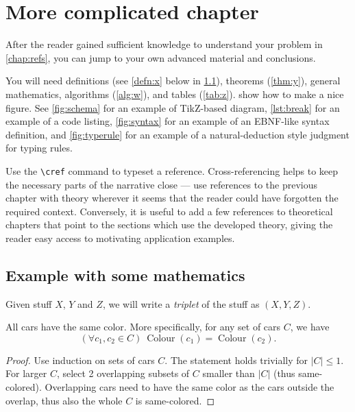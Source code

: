 \chapter{More complicated chapter}\label{chap:math}

After the reader gained sufficient knowledge to understand your problem in \cref{chap:refs}, you can jump to your own advanced material and conclusions.

You will need definitions (see \cref{defn:x} below in \cref{sec:demo}), theorems (\cref{thm:y}), general mathematics, algorithms (\cref{alg:w}), and tables (\cref{tab:z}).  show how to make a nice figure. See \cref{fig:schema} for an example of TikZ-based diagram, \cref{lst:break} for an example of a code listing, \cref{fig:syntax} for an example of an EBNF-like syntax definition, and \cref{fig:typerule} for an example of a natural-deduction style judgment for typing rules.

Use the \verb|\cref| command to typeset a reference. Cross-referencing helps to keep the necessary parts of the narrative close --- use references to the previous chapter with theory wherever it seems that the reader could have forgotten the required context. Conversely, it is useful to add a few references to theoretical chapters that point to the sections which use the developed theory, giving the reader easy access to motivating application examples.

\section{Example with some mathematics}
\label{sec:demo}

\begin{definition}[Triplet]\label{defn:x}
Given stuff $X$, $Y$ and $Z$, we will write a \emph{triplet} of the stuff as $(X,Y,Z)$.
\end{definition}

\newcommand{\Col}{\operatorname{Colour}}

\begin{theorem}\label{thm:y}
All cars have the same color. More specifically, for any set of cars $C$, we have
$$(\forall c_1, c_2 \in C)\:\Col(c_1) = \Col(c_2).$$
\end{theorem}

\begin{proof}
Use induction on sets of cars $C$. The statement holds trivially for $|C|\leq1$. For larger $C$, select 2 overlapping subsets of $C$ smaller than $|C|$ (thus same-colored). Overlapping cars need to have the same color as the cars outside the overlap, thus also the whole $C$ is same-colored.
\end{proof}

